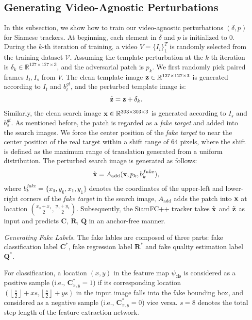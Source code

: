 \documentclass[journal]{IEEEtran}
\newcommand{\ie}{i.e.}
\begin{document}
\subsection{Generating Video-Agnostic Perturbations}\label{generate}

In this subsection, we show how to train our video-agnostic perturbations $(\delta, p)$ for Siamese trackers. At beginning, each element in $\delta$ and $p$ is initialized to 0.
During the $k$-th iteration of training, a video $V=\{I_i\}_1^T$ is randomly selected from the training dataset $\mathcal V$. 
Assuming the template perturbation at the $k$-th iteration is $\delta_k \in \mathbb{R}^{127\times 127 \times 3}$, and the adversarial patch is $p_k$. 
We first randomly pick paired frames $I_t, I_s$ from $V$. The clean template image $\textbf z\in \mathbb{R}^{127\times 127 \times 3}$ is generated according to $I_t$ and $b^{gt}_t$, and the perturbed template image is:
\begin{equation}
\tilde {\textbf z} = \textbf z + \delta_k.
\end{equation}
Similarly, the clean search image $\textbf x \in \mathbb{R}^{303\times 303 \times 3}$ is generated according to $I_s$ and $b^{gt}_s$.
As mentioned before, the patch is regarded as a \textit{fake target} and added into the search images. We force the center position of the \textit{fake target} to near the center position of the real target within a shift range of 64 pixels, where the shift is defined as the maximum range of translation generated from a uniform distribution.
The perturbed search image is generated as follows:
\begin{equation}
\tilde{\textbf x} = A_{\text{add}}(\textbf x, p_k, b^{fake}_k),
\end{equation}
where $ b^{fake}_k = \{x_0, y_0, x_1, y_1\}$ denotes the coordinates of the upper-left and lower-right corners of the \textit{fake target} in the search image, \uline{$A_\text{add}$} adds the patch into $\textbf x$ at location $(\frac{x_0+x_1}{2},\frac{y_0+y_1}{2})$. Subsequently, the SiamFC++ tracker takes $\tilde {\textbf x}$ and $\tilde{\textbf z}$ as input and predicts $\textbf{C, R, Q}$ in an anchor-free manner.

\textit{Generating Fake Labels.} The fake lables are composed of three parts: fake classification label $\textbf{C}^*$, fake regression label $\textbf{R}^*$ and fake quality estimation label $\textbf{Q}^*$.

For classification, a location $(x,y)$ in the feature map $\psi_{\mathrm{cls}}$ is considered as a positive sample (\ie, $\textbf{C}^*_{x,y} = 1$) if its corresponding location $\left(\left\lfloor\frac{s}{2}\right\rfloor+x s,\left\lfloor\frac{s}{2}\right\rfloor+y s\right)$ in the input image falls into the fake bounding box, and considered as a negative sample (\ie, $\textbf{C}^*_{x,y} = 0$) vice versa. $s=8$ denotes the total step length of the feature extraction network.
\end{document}
